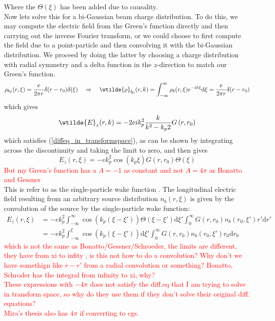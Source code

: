 Where the $\Theta(\xi)$ has been added due to causality.\\
Now lets solve this for a bi-Gaussian beam charge distribution. To do this, we may compute the electric field from the Green's function directly and then carrying out the inverse Fourier transform, or we could choose to first compute the field due to a point-particle and then convolving it with the bi-Gaussian distribution. We proceed by doing the latter by choosing a charge distribution with radial symmetry and a delta function in the $z$-direction to match our Green's function.
\begin{align}
{\rho}_{b_0}(r,\xi)=\frac{e}{2\pi r}\delta(r-r_0)\delta(\xi) \quad \Rightarrow\quad  \wtilde{\rho}_{b_0}(r,k)=\int_ {-\infty}^{\infty}\rho_b(r,\xi)e^{-ik\xi}\mathrm{d}\xi=\frac{e}{2\pi r}\delta(r-r_0)
\end{align}
which gives 
\begin{equation}
\wtilde{E}_z(r,k)=-2eik_p^2\frac{k}{k^2-k_p2}G\left(r,r_0\right)
\end{equation}
which satisfies (\ref{diffeq_in_transformspace}), as can be shown by integrating across the discontinuity and taking the limit to zero, and then gives
\begin{equation}
E_z(r,\xi)=-ek_p^2\cos(k_p\xi)G\left(r,r_0\right)\Theta(\xi)
\end{equation}
\textcolor{red}{But my Green's function has a $A=-1$ as constant and not $A=4\pi$ as Bonatto and Gessner}\\
This is refer to as the single-particle wake function \citep{Gessner2016}. The longitudinal electric field resulting from an arbitrary source distribution $n_b(r,\xi)$ is given by the convolution of the source by the single-particle wake function:
\begin{align}
E_z(r,\xi)&=-ek_p^2 \int_{-\infty}^{\infty} \cos(k_p(\xi-\xi'))\Theta(\xi-\xi')\mathrm{d}\xi' \int_{0}^{\infty}G\left(r,r_0\right) n_b(r_0,\xi')r'\mathrm{d}r'\\
&=-ek_p^2 \int_{-\infty}^{\xi} \cos(k_p(\xi-\xi'))\mathrm{d}\xi' \int_{0}^{\infty}G\left(r,r_0\right) n_b(r_0,\xi')r_0\mathrm{d}r_0
\end{align}
\textcolor{red}{which is not the same as Bonatto/Gessner/Schroeder, the limits are different, they have from xi to infity  , is this not how to do a convolution? Why don't we have somethign like $r-r'$ from a radial convolution or something? Bonatto, Schroder has the integral from infinity to xi, why? \\ These expressions with $-4\pi$ does not satisfy the diff.eq that I am trying to solve in transform space, so why do they use them if they don't solve their original diff. equations?\\ Mira's thesis also has $4\pi$ if converting to cgs.}
